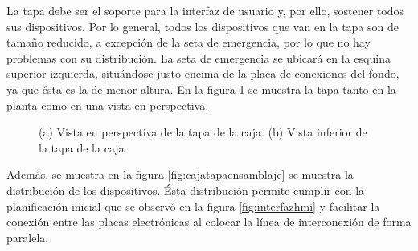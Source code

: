 La tapa debe ser el soporte para la interfaz de usuario y, por ello, sostener todos sus 
dispositivos. Por lo general, todos los dispositivos que van en la tapa son de tamaño reducido,
a excepción de la seta de emergencia, por lo que no hay problemas con su distribución. La seta
de emergencia se ubicará en la esquina superior izquierda, situándose justo encima de la placa
de conexiones del fondo, ya que ésta es la de menor altura. En la figura \ref{fig:cajatapa} se 
muestra la tapa tanto en la planta como en una vista en perspectiva.

\newpage

\begin{figure}[h]%
    \centering 
    \hspace{10pt}%
    \caption{(a) Vista en perspectiva de la tapa de la caja. (b) Vista inferior de la tapa de la caja}
    \label{fig:cajatapa} 
\end{figure} 

\vspace{1cm}

Además, se muestra en la figura \ref{fig:cajatapaensamblaje} se muestra la distribución de los 
dispositivos. Ésta distribución permite cumplir con la planificación inicial que se observó en 
la figura \ref{fig:interfazhmi} y facilitar la conexión entre las placas electrónicas al colocar
la línea de interconexión de forma paralela.

\vspace{1cm}

